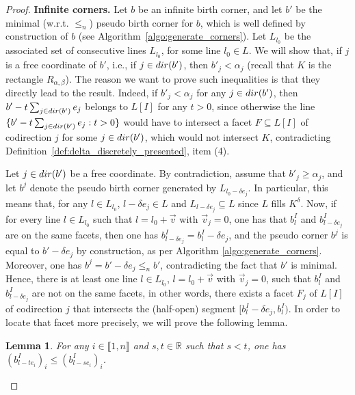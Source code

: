 \documentclass{article}
\newcommand{\dir}[1]{ {\rm dir}(#1) }
\newcommand{\R}{\mathbb{R}}
\newcommand{\leqn}{\leq_n}
\newcommand{\lowerb}[1]{ L[#1] }
\newcommand{\rectangle}[2]{ R_{#1, #2} }
\DeclareRobustCommand*{\ora}{\overrightarrow}
\newtheorem{lemma}[theorem]{Lemma}
\begin{document}
\begin{proof}
		\textbf{Infinite corners.} %
		Let $b$ be an infinite birth corner, and %
		let $b'$ be the minimal (w.r.t. $\leqn$) pseudo birth corner for $b$, which is well defined by construction of $b$ (see Algorithm~\ref{algo:generate_corners}).
		Let $L_{l_0}$ be the associated set of consecutive lines $L_{l_0}$, for some line $l_0 \in L$.
		We will show that, if $j$ is a free coordinate of $b'$, i.e., if $j\in\dir{b'}$, then $b'_j < \alpha_j$ (recall that $K$ is the rectangle $\rectangle{\alpha}{\beta}$).
		The reason we want to prove such inequalities is that they directly lead to
		the result. Indeed, if $b'_j < \alpha_j$ for any $j\in\dir{b'}$, then $b' - t \sum_{j\in\dir{b'}} e_j$ belongs to $\lowerb{I}$ for any $t>0$,
		since otherwise the line $\{b' - t \sum_{j\in\dir{b'}} e_j : t >0\}$ would have to intersect a facet $F\subseteq \lowerb{I}$ of codirection $j$ for some $j\in \dir{b'}$,
		which would not intersect $K$, contradicting Definition~\ref{def:delta_discretely_presented}, item (4).

		Let $j\in \dir{b'}$ be a free coordinate. By contradiction, assume that %
		$b'_j \ge \alpha_j$, and let $b^j$ denote the pseudo birth corner generated by $L_{l_0- \delta e_j}$.
		In particular, this means that, for any $l\in L_{l_0}$,
		$l- \delta e_j \in L$ and $L_{l- \delta e_j} \subseteq L$ since $L$ fills $K^{ \delta}$.
		Now, if for every line $l \in L_{l_0}$ such that $l=l_0+\ora v$ with $\ora v_j=0$, one has that $b_l^I$ and $b_{l- \delta e_j}^I$
		are on the same facets, then one has $b_{l- \delta e_j}^I = b_l^I - \delta e_j$, and
		the pseudo corner $b^j$ %
		is equal to $b' - \delta e_j$ by construction, as per Algorithm \ref{algo:generate_corners}.
		Moreover, one has $b^j = b' - \delta e_j \leqn b'$, contradicting the fact that $b'$ is minimal.
		Hence, there is at least one line $l\in L_{l_0}$, $l=l_0+\ora v$ with $\ora v_j=0$, such that $b_l^I$ and $b_{l- \delta e_j}^I$ are not
		on the same facets, in other words, there exists a facet
		$F_j$ of $\lowerb{I}$ of codirection $j$ that intersects the (half-open) segment $[b_l^I - \delta e_j, b_l^I)$.
		In order to locate that facet more precisely, we will prove the following lemma.


		\begin{lemma}\label{lemma:decreasing_coord}
			For any $i\in \llbracket 1,n\rrbracket$ and $s,t\in\R$ such that $s<t$, one has $(b^I_{l-t e_i})_i \leq (b^I_{l-s e_i})_i$.
		\end{lemma}


\end{proof}
\end{document}
